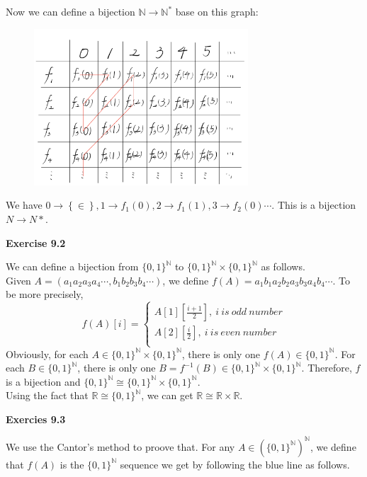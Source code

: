 \documentclass{article} %
\begin{document}
    Now we can define a bijection $\mathbb{N}\rightarrow \mathbb{N}^*$ base on this graph:
    \begin{figure}[H]
  	\centering
  	\includegraphics[width=8cm]{9_1_3.png}
  	\caption{}
  	\label{}
  	\end{figure}
    We have $0\rightarrow \left\{\in\right\},1\rightarrow f_1\left(0\right),2\rightarrow f_1\left(1\right),3\rightarrow f_2\left(0\right)\cdots$. This is a bijection $N\rightarrow N*$.


\textbf{Exercise 9.2}\par
We can define a bijection from $\{0,1\}^\mathbb{N}$ to $\{0,1\}^\mathbb{N}\times \{0,1\}^\mathbb{N}$ as follows.\\
Given $A=(a_1a_2a_3a_4\cdots,b_1b_2b_3b_4\cdots)$, we define $f(A)=a_1b_1a_2b_2a_3b_3a_4b_4\cdots$. To be more precisely,
$$ f(A)[i]=\left\{
\begin{aligned}
A[1][\frac{i+1}{2}],\ i\ is\ odd\ number \\
A[2][\frac{i}{2}],\ i\ is\ even\ number \\
\end{aligned}
\right.
$$
Obviously, for each $A\in \{0,1\}^\mathbb{N}\times \{0,1\}^\mathbb{N}$, there is only one $f(A)\in \{0,1\}^\mathbb{N}$. For each $B\in \{0,1\}^\mathbb{N}$, there is only one $B=f^{-1}(B)\in \{0,1\}^\mathbb{N}\times \{0,1\}^\mathbb{N}$. Therefore, $f$ is a bijection and $\{0,1\}^\mathbb{N}\cong \{0,1\}^\mathbb{N}\times\{0,1\}^\mathbb{N}$.\\
Using the fact that $\mathbb{R}\cong \{0,1\}^\mathbb{N}$, we can get $\mathbb{R}\cong \mathbb{R}\times \mathbb{R}$.

\textbf{Exercies 9.3}\par
We use the Cantor's method to proove that. For any $A\in (\{0,1\}^\mathbb{N})^\mathbb{N}$, we define that $f(A)$ is the $\{0,1\}^\mathbb{N}$ sequence we get by following the blue line as follows.
\end{document}

